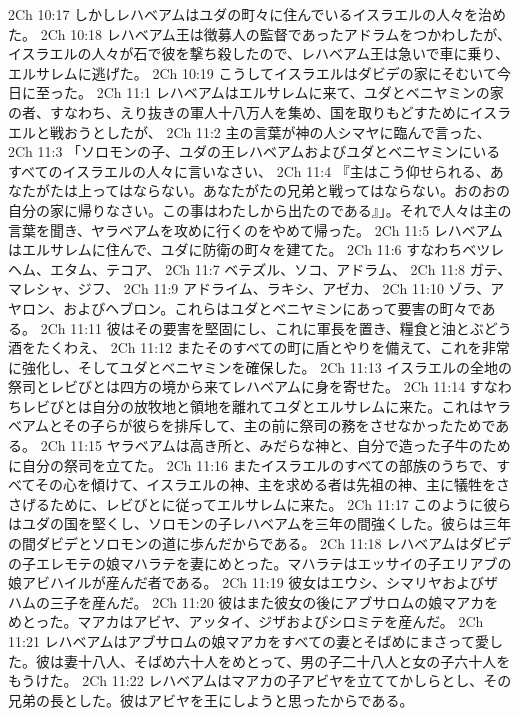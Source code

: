 2Ch 10:17  しかしレハベアムはユダの町々に住んでいるイスラエルの人々を治めた。
2Ch 10:18  レハベアム王は徴募人の監督であったアドラムをつかわしたが、イスラエルの人々が石で彼を撃ち殺したので、レハベアム王は急いで車に乗り、エルサレムに逃げた。
2Ch 10:19  こうしてイスラエルはダビデの家にそむいて今日に至った。
2Ch 11:1  レハベアムはエルサレムに来て、ユダとベニヤミンの家の者、すなわち、えり抜きの軍人十八万人を集め、国を取りもどすためにイスラエルと戦おうとしたが、
2Ch 11:2  主の言葉が神の人シマヤに臨んで言った、
2Ch 11:3  「ソロモンの子、ユダの王レハベアムおよびユダとベニヤミンにいるすべてのイスラエルの人々に言いなさい、
2Ch 11:4  『主はこう仰せられる、あなたがたは上ってはならない。あなたがたの兄弟と戦ってはならない。おのおの自分の家に帰りなさい。この事はわたしから出たのである』」。それで人々は主の言葉を聞き、ヤラベアムを攻めに行くのをやめて帰った。
2Ch 11:5  レハベアムはエルサレムに住んで、ユダに防衛の町々を建てた。
2Ch 11:6  すなわちベツレヘム、エタム、テコア、
2Ch 11:7  ベテズル、ソコ、アドラム、
2Ch 11:8  ガテ、マレシャ、ジフ、
2Ch 11:9  アドライム、ラキシ、アゼカ、
2Ch 11:10  ゾラ、アヤロン、およびヘブロン。これらはユダとベニヤミンにあって要害の町々である。
2Ch 11:11  彼はその要害を堅固にし、これに軍長を置き、糧食と油とぶどう酒をたくわえ、
2Ch 11:12  またそのすべての町に盾とやりを備えて、これを非常に強化し、そしてユダとベニヤミンを確保した。
2Ch 11:13  イスラエルの全地の祭司とレビびとは四方の境から来てレハベアムに身を寄せた。
2Ch 11:14  すなわちレビびとは自分の放牧地と領地を離れてユダとエルサレムに来た。これはヤラベアムとその子らが彼らを排斥して、主の前に祭司の務をさせなかったためである。
2Ch 11:15  ヤラベアムは高き所と、みだらな神と、自分で造った子牛のために自分の祭司を立てた。
2Ch 11:16  またイスラエルのすべての部族のうちで、すべてその心を傾けて、イスラエルの神、主を求める者は先祖の神、主に犠牲をささげるために、レビびとに従ってエルサレムに来た。
2Ch 11:17  このように彼らはユダの国を堅くし、ソロモンの子レハベアムを三年の間強くした。彼らは三年の間ダビデとソロモンの道に歩んだからである。
2Ch 11:18  レハベアムはダビデの子エレモテの娘マハラテを妻にめとった。マハラテはエッサイの子エリアブの娘アビハイルが産んだ者である。
2Ch 11:19  彼女はエウシ、シマリヤおよびザハムの三子を産んだ。
2Ch 11:20  彼はまた彼女の後にアブサロムの娘マアカをめとった。マアカはアビヤ、アッタイ、ジザおよびシロミテを産んだ。
2Ch 11:21  レハベアムはアブサロムの娘マアカをすべての妻とそばめにまさって愛した。彼は妻十八人、そばめ六十人をめとって、男の子二十八人と女の子六十人をもうけた。
2Ch 11:22  レハベアムはマアカの子アビヤを立ててかしらとし、その兄弟の長とした。彼はアビヤを王にしようと思ったからである。
